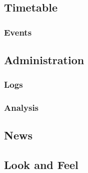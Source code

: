 \subsection{Timetable}

\subsubsection{Events}

\subsection{Administration}

\subsubsection{Logs}

\subsubsection{Analysis}

\subsection{News}

\subsection{Look and Feel}

